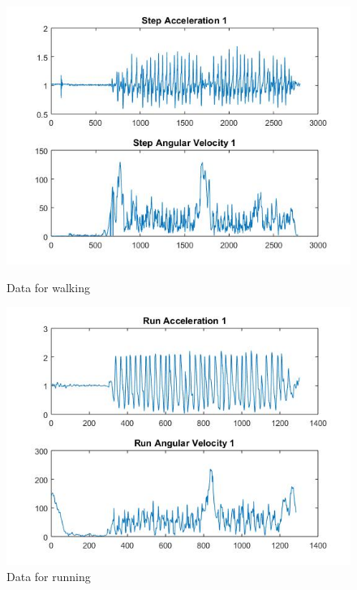 \documentclass[letterpaper,12pt,titlepage,oneside,final]{book}
\begin{document}
\begin{figure}[h!]
	\centering
	\hspace{-2.3cm}
	\begin{minipage}[b]{0.5\textwidth}
		\centering
		\includegraphics[scale=0.5]{step_1}
		\caption{Data for walking}
	\end{minipage}%
	\hfill
	\begin{minipage}[b]{0.5\textwidth}
		\centering
		\includegraphics[scale=0.5]{run_1}
		\caption{Data for running}
	\end{minipage}	
\end{figure}
\end{document}

